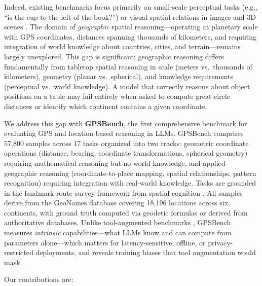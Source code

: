 Indeed, existing benchmarks focus primarily on small-scale perceptual tasks (e.g., ``is the cup to the left of the book?'') or visual spatial relations in images and 3D scenes \citep{kamath2023whatsup, marcu2024lingoqa}. The domain of \textit{geographic} spatial reasoning---operating at planetary scale with GPS coordinates, distances spanning thousands of kilometers, and requiring integration of world knowledge about countries, cities, and terrain---remains largely unexplored. This gap is significant: geographic reasoning differs fundamentally from tabletop spatial reasoning in scale (meters vs.\ thousands of kilometers), geometry (planar vs.\ spherical), and knowledge requirements (perceptual vs.\ world knowledge). A model that correctly reasons about object positions on a table may fail entirely when asked to compute great-circle distances or identify which continent contains a given coordinate.

We address this gap with \textbf{GPSBench}, the first comprehensive benchmark for evaluating GPS and location-based reasoning in LLMs. GPSBench comprises 57,800 samples across 17 tasks organized into two tracks: geometric coordinate operations (distance, bearing, coordinate transformations, spherical geometry) requiring mathematical reasoning but no world knowledge, and applied geographic reasoning (coordinate-to-place mapping, spatial relationships, pattern recognition) requiring integration with real-world knowledge. Tasks are grounded in the landmark-route-survey framework from spatial cognition \citep{siegel1975development}. All samples derive from the GeoNames database covering 18,196 locations across six continents, with ground truth computed via geodetic formulas or derived from authoritative databases. Unlike tool-augmented benchmarks \citep{krechetova2025geobenchx, zhang2025geoanalystbench}, GPSBench measures \textit{intrinsic} capabilities---what LLMs know and can compute from parameters alone---which matters for latency-sensitive, offline, or privacy-restricted deployments, and reveals training biases that tool augmentation would mask.

Our contributions are:

